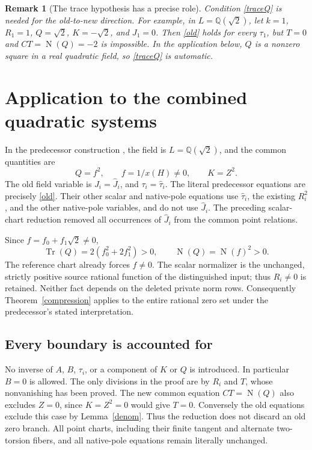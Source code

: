 \documentclass[11pt]{article}
\newtheorem{remark}[theorem]{Remark}
\newcommand{\Q}{\mathbb Q}
\newcommand{\Tr}{\operatorname{Tr}}
\newcommand{\Nm}{\operatorname{N}}
\begin{document}
\begin{remark}[The trace hypothesis has a precise role]
Condition \eqref{traceQ} is needed for the old-to-new direction.
For example, in \(L=\Q(\sqrt2)\), let \(k=1\), \(R_1=1\),
\(Q=\sqrt2\), \(K=-\sqrt2\), and \(J_1=0\). Then
\eqref{old} holds for every \(\tau_1\), but \(T=0\) and
\(CT=\Nm(Q)=-2\) is impossible. In the application below,
\(Q\) is a nonzero square in a real quadratic field, so
\eqref{traceQ} is automatic.
\end{remark}

\section{Application to the combined quadratic systems}

In the predecessor construction \cite{rechart}, the field is
\(L=\Q(\sqrt2)\), and the common quantities are
\[
 Q=f^2,\qquad f=1/x(H)\ne0,\qquad K=Z^2.
\]
The old field variable is \(J_i=\widehat J_i\), and
\(\tau_i=\widehat\tau_i\). The literal predecessor equations
are precisely \eqref{old}. Their other scalar and native-pole
equations use \(\widehat\tau_i\), the existing \(R_i^2\), and
the other native-pole variables, and do not use \(\widehat J_i\).
The preceding scalar-chart reduction removed all occurrences of
\(\widehat J_i\) from the common point relations.

Since \(f=f_0+f_1\sqrt2\ne0\),
\[
                   \Tr(Q)=2(f_0^2+2f_1^2)>0,
 \qquad \Nm(Q)=\Nm(f)^2>0.
\]
The reference chart already forces \(f\ne0\). The scalar
normalizer is the unchanged, strictly positive source rational
function of the distinguished input; thus \(R_i\ne0\) is
retained. Neither fact depends on the deleted private norm rows.
Consequently Theorem~\ref{compression} applies to the entire
rational zero set under the predecessor's stated interpretation.

\subsection{Every boundary is accounted for}

No inverse of \(A\), \(B\), \(\tau_i\), or a component of
\(K\) or \(Q\) is introduced. In particular \(B=0\) is
allowed. The only divisions in the proof are by \(R_i\) and
\(T\), whose nonvanishing has been proved. The new common
equation \(CT=\Nm(Q)\) also excludes \(Z=0\), since
\(K=Z^2=0\) would give \(T=0\). Conversely the old equations
exclude this case by Lemma~\ref{denom}. Thus the reduction
does not discard an old zero branch. All point charts, including
their finite tangent and alternate two-torsion fibers, and all
native-pole equations remain literally unchanged.
\end{document}

